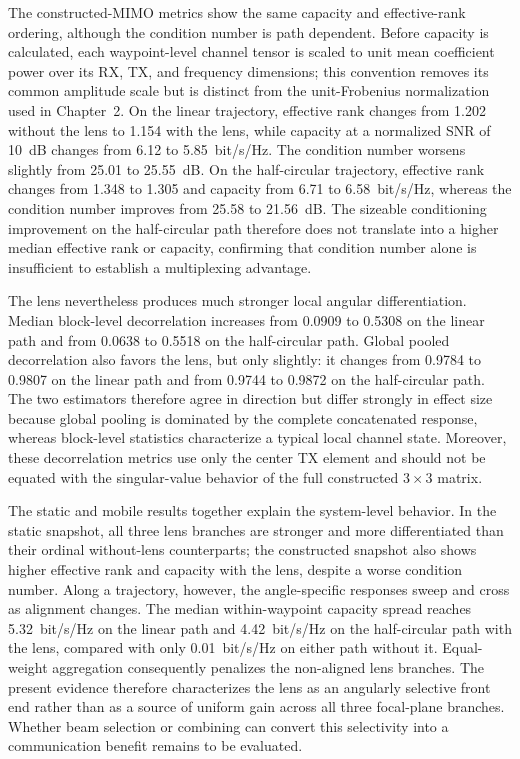 The constructed-MIMO metrics show the same capacity and effective-rank ordering, although the condition number is path dependent. Before capacity is calculated, each waypoint-level channel tensor is scaled to unit mean coefficient power over its RX, TX, and frequency dimensions; this convention removes its common amplitude scale but is distinct from the unit-Frobenius normalization used in Chapter~2. On the linear trajectory, effective rank changes from 1.202 without the lens to 1.154 with the lens, while capacity at a normalized SNR of 10~dB changes from 6.12 to 5.85~bit/s/Hz. The condition number worsens slightly from 25.01 to 25.55~dB. On the half-circular trajectory, effective rank changes from 1.348 to 1.305 and capacity from 6.71 to 6.58~bit/s/Hz, whereas the condition number improves from 25.58 to 21.56~dB. The sizeable conditioning improvement on the half-circular path therefore does not translate into a higher median effective rank or capacity, confirming that condition number alone is insufficient to establish a multiplexing advantage.

The lens nevertheless produces much stronger local angular differentiation. Median block-level decorrelation increases from 0.0909 to 0.5308 on the linear path and from 0.0638 to 0.5518 on the half-circular path. Global pooled decorrelation also favors the lens, but only slightly: it changes from 0.9784 to 0.9807 on the linear path and from 0.9744 to 0.9872 on the half-circular path. The two estimators therefore agree in direction but differ strongly in effect size because global pooling is dominated by the complete concatenated response, whereas block-level statistics characterize a typical local channel state. Moreover, these decorrelation metrics use only the center TX element and should not be equated with the singular-value behavior of the full constructed $3\times3$ matrix.

The static and mobile results together explain the system-level behavior. In the static snapshot, all three lens branches are stronger and more differentiated than their ordinal without-lens counterparts; the constructed snapshot also shows higher effective rank and capacity with the lens, despite a worse condition number. Along a trajectory, however, the angle-specific responses sweep and cross as alignment changes. The median within-waypoint capacity spread reaches 5.32~bit/s/Hz on the linear path and 4.42~bit/s/Hz on the half-circular path with the lens, compared with only 0.01~bit/s/Hz on either path without it. Equal-weight aggregation consequently penalizes the non-aligned lens branches. The present evidence therefore characterizes the lens as an angularly selective front end rather than as a source of uniform gain across all three focal-plane branches. Whether beam selection or combining can convert this selectivity into a communication benefit remains to be evaluated.


